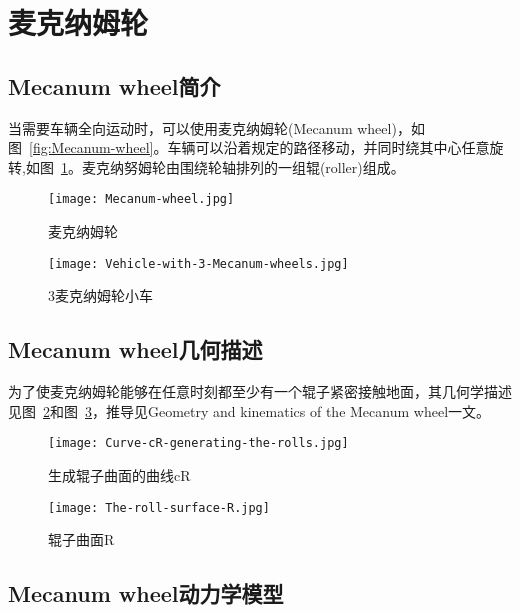 \section{麦克纳姆轮}

\subsection{Mecanum wheel简介}
当需要车辆全向运动时，可以使用麦克纳姆轮(Mecanum wheel)，如图~\ref{fig:Mecanum-wheel}。车辆可以沿着规定的路径移动，并同时绕其中心任意旋转,如图~\ref{fig:Vehicle-with-3-Mecanum-wheels}。麦克纳努姆轮由围绕轮轴排列的一组辊(roller)组成。

\begin{figure}
    \begin{minipage}{0.48\textwidth}
      \centering
      \texttt{[image: Mecanum-wheel.jpg]}
      \caption{麦克纳姆轮}
      \label{fig:Mecanum-wheel}
    \end{minipage}\hfill
    \begin{minipage}{0.48\textwidth}
      \centering
      \texttt{[image: Vehicle-with-3-Mecanum-wheels.jpg]}
      \caption{3麦克纳姆轮小车}
      \label{fig:Vehicle-with-3-Mecanum-wheels}
    \end{minipage}
\end{figure}

\subsection{Mecanum wheel几何描述}
为了使麦克纳姆轮能够在任意时刻都至少有一个辊子紧密接触地面，其几何学描述见图~\ref{fig:Curve-cR-generating-the-rolls}和图~\ref{fig:The-roll-surface-R}，推导见Geometry and kinematics of the Mecanum wheel\cite{gfrerrer2008geometry}一文。

\begin{figure}[htbp]
    \centering
    \texttt{[image: Curve-cR-generating-the-rolls.jpg]}
    \caption{生成辊子曲面的曲线cR}
    \label{fig:Curve-cR-generating-the-rolls}
\end{figure}

\begin{figure}[htbp]
    \centering
    \texttt{[image: The-roll-surface-R.jpg]}
    \caption{辊子曲面R}
    \label{fig:The-roll-surface-R}
\end{figure}

\subsection{Mecanum wheel动力学模型}

